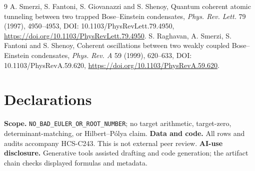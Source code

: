 \documentclass[10pt]{article}
\begin{document}
\begin{thebibliography}{9}
 A. Smerzi, S. Fantoni, S. Giovanazzi and S. Shenoy,
Quantum coherent atomic tunneling between two trapped Bose--Einstein
condensates, \emph{Phys. Rev. Lett.} 79 (1997), 4950--4953,
DOI: 10.1103/PhysRevLett.79.4950, \url{https://doi.org/10.1103/PhysRevLett.79.4950}.
 S. Raghavan, A. Smerzi, S. Fantoni and S. Shenoy,
Coherent oscillations between two weakly coupled Bose--Einstein condensates,
\emph{Phys. Rev. A} 59 (1999), 620--633, DOI: 10.1103/PhysRevA.59.620,
\url{https://doi.org/10.1103/PhysRevA.59.620}.
\end{thebibliography}

\section*{Declarations}
\textbf{Scope.} \texttt{NO\_BAD\_EULER\_OR\_ROOT\_NUMBER}; no target
arithmetic, target-zero, determinant-matching, or Hilbert--Pólya claim.
\textbf{Data and code.} All rows and audits accompany HCS-C243. This is not
external peer review. \textbf{AI-use disclosure.} Generative tools assisted
drafting and code generation; the artifact chain checks displayed formulas and
metadata.
\end{document}
